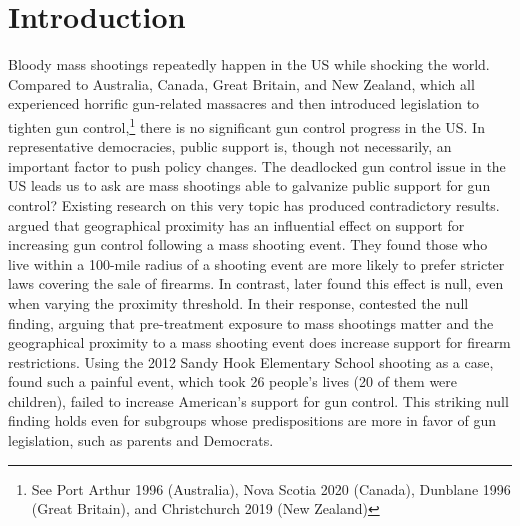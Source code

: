 \documentclass[11pt]{article}
\begin{document}
\section{Introduction}
Bloody mass shootings repeatedly happen in the US while shocking the world. Compared to Australia, Canada, Great Britain, and New Zealand, which all experienced horrific gun-related massacres and then introduced legislation to tighten gun control,\footnote{See Port Arthur 1996 (Australia), Nova Scotia 2020 (Canada), Dunblane 1996 (Great Britain), and Christchurch 2019 (New Zealand)} there is no significant gun control progress in the US. In representative democracies, public support is, though not necessarily, an important factor to push policy changes. The deadlocked gun control issue in the US leads us to ask are mass shootings able to galvanize public support for gun control? Existing research on this very topic has produced contradictory results. \textcite{newman2019mass-shootings-} argued that geographical proximity has an influential effect on support for increasing gun control following a mass shooting event. They found those who live within a 100-mile radius of a shooting event are more likely to prefer stricter laws covering the sale of firearms. In contrast, \textcite{barney2019reexamining-the} later found this effect is null, even when varying the proximity threshold. In their response, \textcite{hartman2019accounting-for-} contested the null finding, arguing that pre-treatment exposure to mass shootings matter and the geographical proximity to a mass shooting event does increase support for firearm restrictions. Using the 2012 Sandy Hook Elementary School shooting as a case, \textcite[][RT hereafter]{rogowski2019critical-events} found such a painful event, which took 26 people's lives (20 of them were children), failed to increase American's support for gun control. This striking null finding holds even for subgroups whose predispositions are more in favor of gun legislation, such as parents and Democrats.
\end{document}
